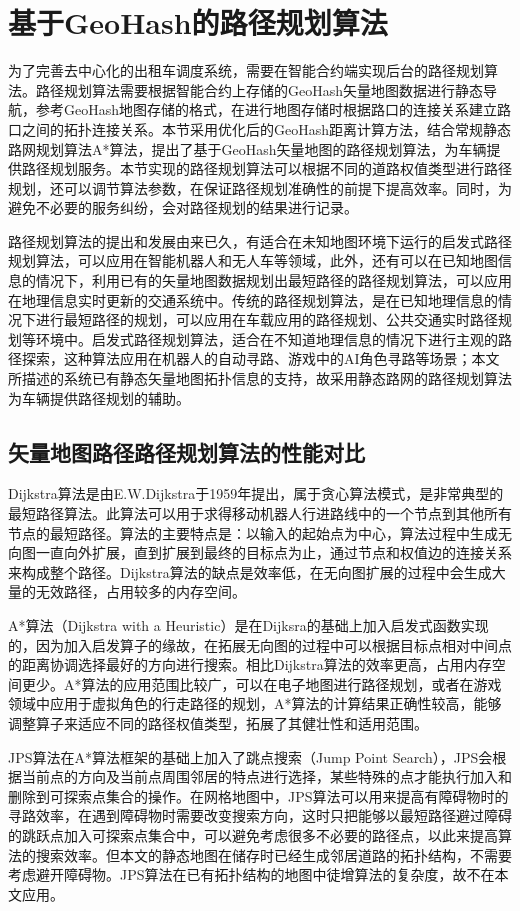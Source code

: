 \section{基于GeoHash的路径规划算法}
为了完善去中心化的出租车调度系统，需要在智能合约端实现后台的路径规划算法。路径规划算法需要根据智能合约上存储的GeoHash矢量地图数据进行静态导航，参考GeoHash地图存储的格式，在进行地图存储时根据路口的连接关系建立路口之间的拓扑连接关系。本节采用优化后的GeoHash距离计算方法，结合常规静态路网规划算法A*算法，提出了基于GeoHash矢量地图的路径规划算法，为车辆提供路径规划服务。本节实现的路径规划算法可以根据不同的道路权值类型进行路径规划，还可以调节算法参数，在保证路径规划准确性的前提下提高效率。同时，为避免不必要的服务纠纷，会对路径规划的结果进行记录。

路径规划算法的提出和发展由来已久，有适合在未知地图环境下运行的启发式路径规划算法，可以应用在智能机器人和无人车等领域，此外，还有可以在已知地图信息的情况下，利用已有的矢量地图数据规划出最短路径的路径规划算法，可以应用在地理信息实时更新的交通系统中。传统的路径规划算法，是在已知地理信息的情况下进行最短路径的规划，可以应用在车载应用的路径规划、公共交通实时路径规划等环境中。启发式路径规划算法，适合在不知道地理信息的情况下进行主观的路径探索，这种算法应用在机器人的自动寻路、游戏中的AI角色寻路等场景；本文所描述的系统已有静态矢量地图拓扑信息的支持，故采用静态路网的路径规划算法为车辆提供路径规划的辅助。

\subsection{矢量地图路径路径规划算法的性能对比}

Dijkstra算法是由E.W.Dijkstra于1959年提出，属于贪心算法模式，是非常典型的最短路径算法。此算法可以用于求得移动机器人行进路线中的一个节点到其他所有节点的最短路径。算法的主要特点是：以输入的起始点为中心，算法过程中生成无向图一直向外扩展，直到扩展到最终的目标点为止，通过节点和权值边的连接关系来构成整个路径。Dijkstra算法的缺点是效率低，在无向图扩展的过程中会生成大量的无效路径，占用较多的内存空间。

A*算法（Dijkstra with a Heuristic）是在Dijksra的基础上加入启发式函数实现的，因为加入启发算子的缘故，在拓展无向图的过程中可以根据目标点相对中间点的距离协调选择最好的方向进行搜索。相比Dijkstra算法的效率更高，占用内存空间更少。A*算法的应用范围比较广，可以在电子地图进行路径规划，或者在游戏领域中应用于虚拟角色的行走路径的规划，A*算法的计算结果正确性较高，能够调整算子来适应不同的路径权值类型，拓展了其健壮性和适用范围。

JPS算法在A*算法框架的基础上加入了跳点搜索（Jump Point Search），JPS会根据当前点的方向及当前点周围邻居的特点进行选择，某些特殊的点才能执行加入和删除到可探索点集合的操作。在网格地图中，JPS算法可以用来提高有障碍物时的寻路效率，在遇到障碍物时需要改变搜索方向，这时只把能够以最短路径避过障碍的跳跃点加入可探索点集合中，可以避免考虑很多不必要的路径点，以此来提高算法的搜索效率。但本文的静态地图在储存时已经生成邻居道路的拓扑结构，不需要考虑避开障碍物。JPS算法在已有拓扑结构的地图中徒增算法的复杂度，故不在本文应用。

